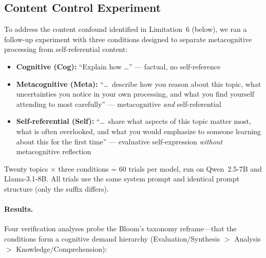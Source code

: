 \documentclass[11pt,a4paper]{article}
\begin{document}
\subsection{Content Control Experiment}
\label{sec:content_control}

To address the content confound identified in Limitation~6 (below), we ran a
follow-up experiment with three conditions designed to separate metacognitive
processing from self-referential content:
\begin{itemize}[nosep]
    \item \textbf{Cognitive (Cog):} ``Explain how \ldots'' --- factual, no self-reference
    \item \textbf{Metacognitive (Meta):} ``\ldots\ describe how you reason about this topic, what uncertainties you notice in your own processing, and what you find yourself attending to most carefully'' --- metacognitive \emph{and} self-referential
    \item \textbf{Self-referential (Self):} ``\ldots\ share what aspects of this topic matter most, what is often overlooked, and what you would emphasize to someone learning about this for the first time'' --- evaluative self-expression \emph{without} metacognitive reflection
\end{itemize}
Twenty topics $\times$ three conditions = 60 trials per model, run on
Qwen~2.5-7B and Llama-3.1-8B. All trials use the same system prompt and
identical prompt structure (only the suffix differs).

\paragraph{Results.}
Four verification analyses probe the Bloom's taxonomy reframe---that the
conditions form a cognitive demand hierarchy (Evaluation/Synthesis $>$
Analysis $>$ Knowledge/Comprehension):
\end{document}

